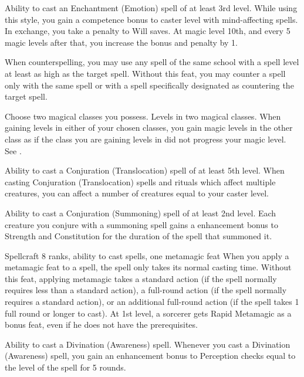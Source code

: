 \featpre Ability to cast an Enchantment (Emotion) spell of at least 3rd level.
\featben While using this style, you gain a  competence bonus to caster level with mind-affecting spells. In exchange, you take a  penalty to Will saves. At magic level 10th, and every 5 magic levels after that, you increase the bonus and penalty by 1.

 When counterspelling, you may use any spell of the same school with a spell level at least as high as the target spell.
 Without this feat, you may counter a spell only with the same spell or with a spell specifically designated as countering the target spell.

Choose two magical classes you possess.
 Levels in two magical classes.
 When gaining levels in either of your chosen classes, you gain magic levels in the other class as if the class you are gaining levels in did not progress your magic level. See .

\featpre Ability to cast a Conjuration (Translocation) spell of at least 5th level.
\featben When casting Conjuration (Translocation) spells and rituals which affect multiple creatures, you can affect a number of creatures equal to your caster level.

 Ability to cast a Conjuration (Summoning) spell of at least 2nd level.
 Each creature you conjure with a summoning spell gains a  enhancement bonus to Strength and Constitution for the duration of the spell that summoned it.

 Spellcraft 8 ranks, ability to cast spells, one metamagic feat
 When you apply a metamagic feat to a spell, the spell only takes its normal casting time.
 Without this feat, applying metamagic takes a standard action (if the spell normally requires less than a standard action), a full-round action (if the spell normally requires a standard action), or an additional full-round action (if the spell takes 1 full round or longer to cast).
 At 1st level, a sorcerer gets Rapid Metamagic as a bonus feat, even if he does not have the prerequisites.

\featpre Ability to cast a Divination (Awareness) spell.
\featben Whenever you cast a Divination (Awareness) spell, you gain an enhancement bonus to Perception checks equal to the level of the spell for 5 rounds.

